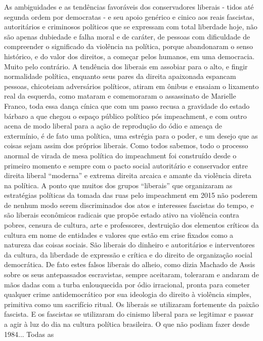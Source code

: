 As ambiguidades e as tendências favoráveis dos conservadores liberais -
tidos até segunda ordem por democratas - e seu apoio genérico e cinico
aos reais fascistas, autoritários e criminosos políticos que se
expressam com total liberdade hoje, não são apenas dubiedade e falha
moral e de caráter, de pessoas com dificuldade de compreender o
significado da violência na política, porque abandonaram o senso
histórico, e do valor dos direitos, a começar pelos humanos, em uma
democracia. Muito pelo contrário. A tendência dos liberais em assobiar
para o alto, e fingir normalidade política, enquanto seus pares da
direita apaixonada espancam pessoas, chicoteiam adversários políticos,
atiram em ônibus e ensaiam o lixamento real da esquerda, como mataram e
comemoraram o assassinato de Marielle Franco, toda essa dança cínica que
com um passo recusa a gravidade do estado bárbaro a que chegou o espaço
público político pós impeachment, e com outro acena de modo liberal para
a ação de reprodução do ódio e ameaça de extermínio, é de fato uma
política, uma estrégia para o poder, e um desejo que as coisas sejam
assim dos próprios liberais. Como todos sabemos, todo o processo anormal
de virada de mesa política do impeachment foi construído desde o
primeiro momento e sempre com o pacto social autoritário e conservador
entre direita liberal ``moderna'' e extrema direita arcaica e amante da
violência direta na política. A ponto que muitos dos grupos ``liberais''
que organizaram as estratégias políticas da tomada das ruas pelo
impeachment em 2015 não poderem de nenhum modo serem discriminados dos
atos e interesses fascistas do tempo, e são liberais econômicos radicais
que propõe estado ativo na violência contra pobres, censura de cultura,
arte e professores, destruição dos elementos críticos da cultura em nome
de entidades e valores que estão em crise fixados como a natureza das
coisas sociais. São liberais do dinheiro e autoritários e interventores
da cultura, da liberdade de expressão e crítica e do direito de
organização social democrática. De fato estes falsos liberais do alheio,
como dizia Machado de Assis sobre os seus antepassados escravistas,
sempre aceitaram, toleraram e andaram de mãos dadas com a turba
enlouquecida por ódio irracional, pronta para cometer qualquer crime
antidemocrático por sua ideologia do direito à violência simples,
primitiva como um sacrifício ritual. Os liberais se utilizaram
fortemente da paixão fascista. E os fascistas se utilizaram do cinismo
liberal para se legitimar e passar a agir à luz do dia na cultura
política brasileira. O que não podiam fazer desde 1984... Todas as
